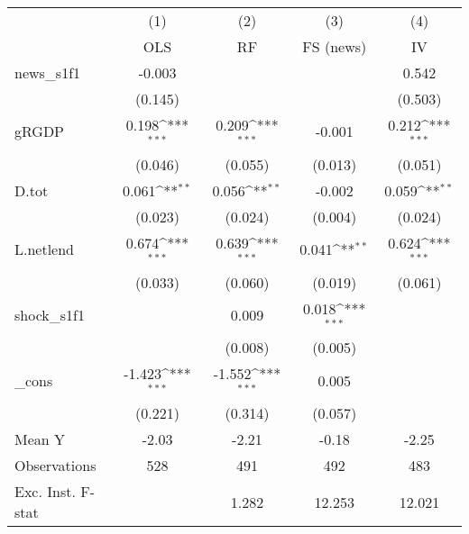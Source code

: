 {
\def\sym#1{\ifmmode^{#1}\else\(^{#1}\)\fi}
\begin{tabular}{l*{4}{c}}
\toprule
            &\multicolumn{1}{c}{(1)}&\multicolumn{1}{c}{(2)}&\multicolumn{1}{c}{(3)}&\multicolumn{1}{c}{(4)}\\
            &\multicolumn{1}{c}{OLS}&\multicolumn{1}{c}{RF}&\multicolumn{1}{c}{FS (news)}&\multicolumn{1}{c}{IV}\\
\midrule
news\_s1f1   &      -0.003         &                     &                     &       0.542         \\
            &     (0.145)         &                     &                     &     (0.503)         \\
\addlinespace
gRGDP       &       0.198\sym{***}&       0.209\sym{***}&      -0.001         &       0.212\sym{***}\\
            &     (0.046)         &     (0.055)         &     (0.013)         &     (0.051)         \\
\addlinespace
D.tot       &       0.061\sym{**} &       0.056\sym{**} &      -0.002         &       0.059\sym{**} \\
            &     (0.023)         &     (0.024)         &     (0.004)         &     (0.024)         \\
\addlinespace
L.netlend   &       0.674\sym{***}&       0.639\sym{***}&       0.041\sym{**} &       0.624\sym{***}\\
            &     (0.033)         &     (0.060)         &     (0.019)         &     (0.061)         \\
\addlinespace
shock\_s1f1  &                     &       0.009         &       0.018\sym{***}&                     \\
            &                     &     (0.008)         &     (0.005)         &                     \\
\addlinespace
\_cons      &      -1.423\sym{***}&      -1.552\sym{***}&       0.005         &                     \\
            &     (0.221)         &     (0.314)         &     (0.057)         &                     \\
\midrule
Mean Y      &       -2.03         &       -2.21         &       -0.18         &       -2.25         \\
Observations&         528         &         491         &         492         &         483         \\
Exc. Inst. F-stat&                     &       1.282         &      12.253         &      12.021         \\
\bottomrule
\end{tabular}
}
